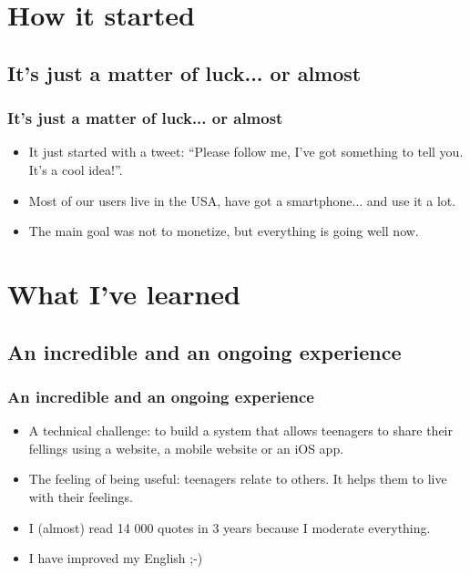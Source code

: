 \documentclass[handout]{beamer}
\begin{document}
	\section{How it started}
	
	\subsection{It's just a matter of luck... or almost}
	\begin{frame}
		\frametitle{It's just a matter of luck... or almost}

		\begin{itemize}
			\item It just started with a tweet: ``Please follow me, I've got something to tell you. It's a cool idea!''.
			\item Most of our users live in the USA, have got a smartphone... and use it a lot.
			\item The main goal was not to monetize, but everything is going well now.
		\end{itemize}

	\end{frame}

	\section{What I've learned}
	
	\subsection{An incredible and an ongoing experience}
	\begin{frame}
		\frametitle{An incredible and an ongoing experience}

		\begin{itemize}
			\item A technical challenge: to build a system that allows teenagers to share their fellings using a website, a mobile website or an iOS app.
			\item The feeling of being useful: teenagers relate to others. It helps them to live with their feelings.
			\item I (almost) read 14 000 quotes in 3 years because I moderate everything.
			\item I have improved my English ;-)
		\end{itemize}

	\end{frame}


\end{document}
